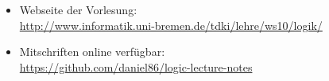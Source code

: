 \documentclass[10pt,a4paper]{article}
\begin{document}
\bigskip

\begin{itemize}
  \item Webseite der Vorlesung:\\
  \url{http://www.informatik.uni-bremen.de/tdki/lehre/ws10/logik/}
  \item Mitschriften online verfügbar:\\
  \url{https://github.com/daniel86/logic-lecture-notes}
\end{itemize}

\tableofcontents
\newpage















\end{document}
